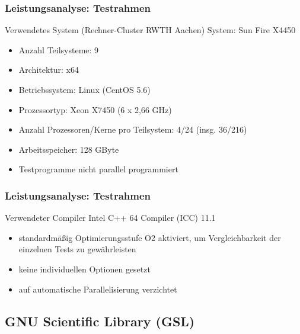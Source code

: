 \documentclass{beamer}
\begin{document}
\begin{frame}
  \frametitle{Leistungsanalyse: Testrahmen}
  
  \begin{block}{Verwendetes System (Rechner-Cluster RWTH Aachen)}
  	System: Sun Fire X4450\\
		\begin{itemize}
			\item Anzahl Teilsysteme: 9\\
			\item Architektur: x64\\
			\item Betriebssystem: Linux (CentOS 5.6)\\
			\item Prozessortyp: Xeon X7450 (6 x 2,66 GHz)\\
			\item Anzahl Prozessoren/Kerne pro Teilsystem: 4/24 (insg. 36/216)\\
			\item Arbeitsspeicher: 128 GByte
		\end{itemize}
  \end{block}
  
  \begin{itemize}
		\item Testprogramme nicht parallel programmiert
  \end{itemize}
\end{frame}

\begin{frame}
  \frametitle{Leistungsanalyse: Testrahmen}
  
  \begin{block}{Verwendeter Compiler}
  	Intel C++ 64 Compiler (ICC) 11.1
		\begin{itemize}
			\item standardmäßig Optimierungsstufe O2 aktiviert, um Vergleichbarkeit der einzelnen Tests zu gewährleisten
			\item keine individuellen Optionen gesetzt
		\end{itemize}
  \end{block}
  
  \begin{itemize}
  	\item auf automatische Parallelisierung verzichtet
  \end{itemize}
\end{frame}

\subsection{GNU Scientific Library (GSL)}
\end{document}

